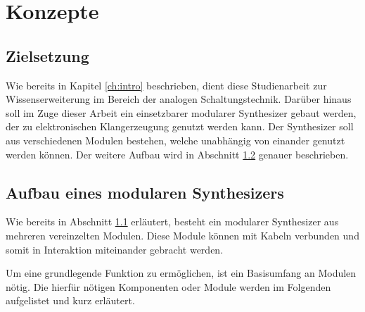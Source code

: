 \chapter{Konzepte}
\label{ch:concept}

\section{Zielsetzung}
\label{sec:zielsetzung}
Wie bereits in Kapitel \ref{ch:intro} beschrieben, dient diese Studienarbeit zur Wissenserweiterung im Bereich der analogen Schaltungstechnik.
Darüber hinaus soll im Zuge dieser Arbeit ein einsetzbarer modularer Synthesizer gebaut werden, der zu elektronischen Klangerzeugung genutzt werden kann. 
Der Synthesizer soll aus verschiedenen Modulen bestehen, welche unabhängig von einander genutzt werden können. 
Der weitere Aufbau wird in Abschnitt \ref{sec:AufbauSynth} genauer beschrieben. 


\section{Aufbau eines modularen Synthesizers}
\label{sec:AufbauSynth}
Wie bereits in Abschnitt \ref{sec:zielsetzung} erläutert, besteht ein modularer Synthesizer aus mehreren vereinzelten Modulen. 
Diese Module können mit Kabeln verbunden und somit in Interaktion miteinander gebracht werden. 

Um eine grundlegende Funktion zu ermöglichen, ist ein Basisumfang an Modulen nötig.
Die hierfür nötigen Komponenten oder Module werden im Folgenden aufgelistet und kurz erläutert.

